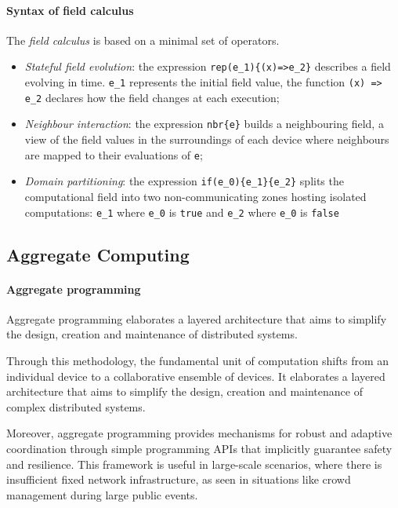 \paragraph{Syntax of field calculus}
The \emph{field calculus} is based on a minimal set of operators.
\begin{itemize}
    \item \emph{Stateful field evolution}: the expression \lstinline|rep(e_1){(x)=>e_2}| describes a field evolving in time.
        \lstinline{e_1} represents the initial field value, the function \lstinline|(x) => e_2| declares how the field changes
        at each execution;
    \item \emph{Neighbour interaction}: the expression \lstinline|nbr{e}| builds a neighbouring field, a view of the field
        values in the surroundings of each device where neighbours are mapped to their evaluations of \texttt{e};
    \item \emph{Domain partitioning}: the expression \lstinline|if(e_0){e_1}{e_2}| splits the computational field into
        two non-communicating zones hosting isolated computations: \lstinline|e_1| where \lstinline|e_0| is \texttt{true} and
        \lstinline{e_2} where \lstinline{e_0} is \texttt{false} %
\end{itemize}

\subsection{Aggregate Computing}
\label{subsec:aggregate-computing}

\paragraph{Aggregate programming}
Aggregate programming elaborates a layered architecture that aims to simplify the design, creation and maintenance of
distributed systems.

Through this methodology, the fundamental unit of computation shifts from an individual device to a collaborative
ensemble of devices.
It elaborates a layered architecture that aims to simplify the design, creation and maintenance of complex distributed
systems.

Moreover, aggregate programming provides mechanisms for robust and adaptive coordination through simple programming APIs
that implicitly guarantee safety and resilience.
This framework is useful in large-scale scenarios, where there is insufficient fixed network infrastructure, as seen in
situations like crowd management during large public events.

